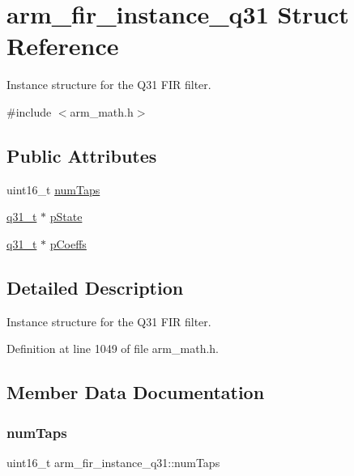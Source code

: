 \hypertarget{structarm__fir__instance__q31}{}\section{arm\+\_\+fir\+\_\+instance\+\_\+q31 Struct Reference}
\label{structarm__fir__instance__q31}


Instance structure for the Q31 F\+IR filter.  




{\ttfamily \#include $<$arm\+\_\+math.\+h$>$}

\subsection*{Public Attributes}
\begin{DoxyCompactItemize}
\item 
uint16\+\_\+t \hyperlink{structarm__fir__instance__q31_a918fadd775b7a0482b21bf34dae2f094}{num\+Taps}
\item 
\hyperlink{arm__math_8h_adc89a3547f5324b7b3b95adec3806bc0}{q31\+\_\+t} $\ast$ \hyperlink{structarm__fir__instance__q31_a409f39c93b744784648bdc365541444d}{p\+State}
\item 
\hyperlink{arm__math_8h_adc89a3547f5324b7b3b95adec3806bc0}{q31\+\_\+t} $\ast$ \hyperlink{structarm__fir__instance__q31_afaae4c884bdf11a4ec2f3b9bb2bb51d0}{p\+Coeffs}
\end{DoxyCompactItemize}


\subsection{Detailed Description}
Instance structure for the Q31 F\+IR filter. 

Definition at line 1049 of file arm\+\_\+math.\+h.



\subsection{Member Data Documentation}
\mbox{\label{structarm__fir__instance__q31_a918fadd775b7a0482b21bf34dae2f094}} 
\subsubsection{\texorpdfstring{num\+Taps}{numTaps}}
{\footnotesize\ttfamily uint16\+\_\+t arm\+\_\+fir\+\_\+instance\+\_\+q31\+::num\+Taps}

